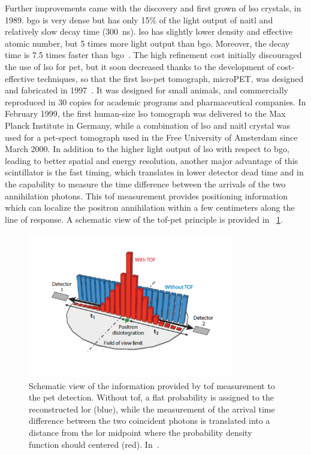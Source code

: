 Further improvements came with the discovery and first grown of \gls{lso} crystals, in 1989. \gls{bgo} is very dense but has only 15\% of the light output of \gls{naitl} and relatively slow decay time (300~ns). \gls{lso} has slightly lower density and effective atomic number, but 5 times more light output than \gls{bgo}. Moreover, the decay time is 7.5 times faster than \gls{bgo}~\parencite{Melcher1992}. The high refinement cost initially discouraged the use of \gls{lso} for \gls{pet}, but it soon decreased thanks to the development of cost-effective techniques, so that the first \gls{lso}-\gls{pet} tomograph, microPET, was designed and fabricated in 1997~\parencite{Cherry1997}. It was designed for small animals, and commercially reproduced in 30 copies for academic programs and pharmaceutical companies. In February 1999, the first human-size \gls{lso} tomograph was delivered to the Max Planck Institute in Germany, while a combination of \gls{lso} and \gls{naitl} crystal was used for a \gls{pet}-\gls{spect} tomograph used in the Free University of Amsterdam since March 2000. 
In addition to the higher light output of \gls{lso} with respect to \gls{bgo}, leading to better spatial and energy resolution, another major advantage of this scintillator is the fast timing, which translates in lower detector dead time and in the capability to measure the time difference between the arrivals of the two annihilation photons. This \gls{tof} measurement provides positioning information which can localize the positron annihilation within a few centimeters along the line of response. A schematic view of the \gls{tof}-\gls{pet} principle is provided in \figurename~\ref{chap2::fig::NM_PET_TOF}. 

\begin{figure}[!htbp]
\centering
\includegraphics[width=0.8\textwidth]{03_GraphicFiles/chapter1_Introduction/PET_TOF.pdf}
\caption{Schematic view of the information provided by \gls{tof} measurement to the \gls{pet} detection. Without \gls{tof}, a flat probability is assigned to the reconstructed \gls{lor} (blue), while the measurement of the arrival time difference between the two coincident photons is translated into a distance from the \gls{lor} midpoint where the probability density function should centered (red). In~\cite{Vaquero2015}.}
\label{chap2::fig::NM_PET_TOF}
\end{figure}   

